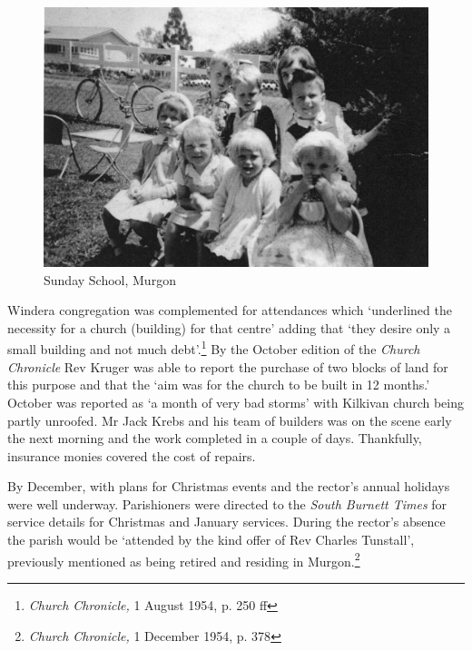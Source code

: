 \begin{figure}
\begin{center}
\includegraphics[width=1.\linewidth,center]{../images/sundaySchoolMurgon.jpg}
\caption{Sunday School, Murgon}
\end{center}
\end{figure}




Windera congregation was complemented for attendances which `underlined the necessity for a church (building) for that centre' adding that `they desire only a small building and not much debt'.\footnote{\emph{Church Chronicle,} 1 August 1954, p. 250 ff} By the October edition of the \emph{Church Chronicle} Rev Kruger was able to report the purchase of two blocks of land for this purpose and that the `aim was for the church to be built in 12 months.' October was reported as `a month of very bad storms' with Kilkivan church being partly unroofed. Mr Jack Krebs and his team of builders was on the scene early the next morning and the work completed in a couple of days. Thankfully, insurance monies covered the cost of repairs.


By December, with plans for Christmas events and the rector's annual holidays were well underway. Parishioners were directed to the \emph{South Burnett Times} for service details for Christmas and January services. During the rector's absence the parish would be `attended by the kind offer of Rev Charles Tunstall', previously mentioned as being retired and residing in Murgon.\footnote{\emph{Church Chronicle,} 1 December 1954, p. 378}



